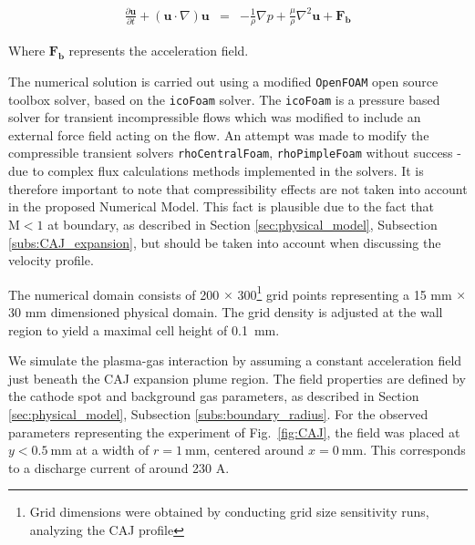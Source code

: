 \documentclass[a4paper]{iacas}%
\begin{document}
\begin{eqnarray}
\label{eqn:NS-Force}
\frac{\partial \boldsymbol{u}}{\partial t} + (\boldsymbol{u} \cdot \nabla)\boldsymbol{u} &=& -\frac{1}{\rho}\nabla p + \frac{\mu}{\rho} \nabla^2 \boldsymbol{u} + \boldsymbol{F_b}
\end{eqnarray}

Where $\boldsymbol{F_b}$ represents the acceleration field.

The numerical solution is carried out using a modified \texttt{OpenFOAM} \cite{OPENFOAM} open source toolbox solver, based on the \texttt{icoFoam} solver. The \texttt{icoFoam} is a pressure based solver for transient incompressible flows which was modified to include an external force field acting on the flow. An attempt was made to modify the compressible transient solvers \texttt{rhoCentralFoam}, \texttt{rhoPimpleFoam} without success - due to complex flux calculations methods implemented in the solvers. It is therefore important to note that compressibility effects are not taken into account in the proposed Numerical Model. This fact is plausible due to the fact that $\mathrm{M} < 1$ at boundary, as described in Section \ref{sec:physical_model}, Subsection \ref{subs:CAJ_expansion}, but should be taken into account when discussing the velocity profile.

The numerical domain consists of 200 $\times$ 300\footnote{Grid dimensions were obtained by conducting grid size sensitivity runs, analyzing the CAJ profile} grid points representing a 15 mm $\times$ 30 mm dimensioned physical domain. The grid density is adjusted at the wall region to yield a maximal cell height of 0.1~mm. 

We simulate the plasma-gas interaction by assuming a constant acceleration field just beneath the CAJ expansion plume region. The field properties are defined by the cathode spot and background gas parameters, as described in Section \ref{sec:physical_model}, Subsection \ref{subs:boundary_radius}. For the observed parameters representing the experiment \cite{KR} of Fig.~\ref{fig:CAJ}, the field was placed at $ y < 0.5~ \mathrm{mm} $ at a width of $r = 1~\mathrm{mm}$, centered around $x=0~\mathrm{mm}$. This corresponds to a discharge current of around 230 A.

\end{document}
